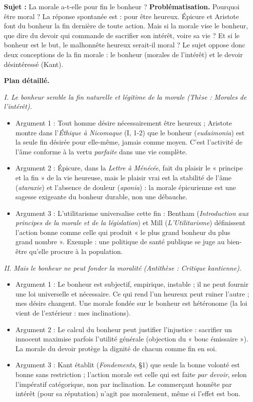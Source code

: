\documentclass[11pt]{article}
\begin{document}
\begin{exoresolu}
\textbf{Sujet :} La morale a-t-elle pour fin le bonheur ?
\tcblower
\textbf{Problématisation.} Pourquoi être moral ? La réponse spontanée est : pour être heureux. Épicure et Aristote font du bonheur la fin dernière de toute action. Mais si la morale vise le bonheur, que dire du devoir qui commande de sacrifier son intérêt, voire sa vie ? Et si le bonheur est le but, le malhonnête heureux serait-il moral ? Le sujet oppose donc deux conceptions de la fin morale : le bonheur (morales de l'intérêt) et le devoir désintéressé (Kant).

\textbf{Plan détaillé.}

\emph{I. Le bonheur semble la fin naturelle et légitime de la morale (Thèse : Morales de l'intérêt).}
\begin{itemize}
\item Argument 1 : Tout homme désire nécessairement être heureux ; Aristote montre dans l'\emph{Éthique à Nicomaque} (I, 1-2) que le bonheur (\emph{eudaimonia}) est la seule fin désirée pour elle-même, jamais comme moyen. C'est l'activité de l'âme conforme à la vertu \emph{parfaite} dans une vie complète.
\item Argument 2 : Épicure, dans la \emph{Lettre à Ménécée}, fait du plaisir le « principe et la fin » de la vie heureuse, mais le plaisir vrai est la stabilité de l'âme (\emph{ataraxie}) et l'absence de douleur (\emph{aponia}) : la morale épicurienne est une sagesse exigeante du bonheur durable, non une débauche.
\item Argument 3 : L'utilitarisme universalise cette fin : Bentham (\emph{Introduction aux principes de la morale et de la législation}) et Mill (\emph{L'Utilitarisme}) définissent l'action bonne comme celle qui produit « le plus grand bonheur du plus grand nombre ». Exemple : une politique de santé publique se juge au bien-être qu'elle procure à la population.
\end{itemize}

\emph{II. Mais le bonheur ne peut fonder la moralité (Antithèse : Critique kantienne).}
\begin{itemize}
\item Argument 1 : Le bonheur est subjectif, empirique, instable ; il ne peut fournir une loi universelle et nécessaire. Ce qui rend l'un heureux peut ruiner l'autre ; mes désirs changent. Une morale fondée sur le bonheur est hétéronome (la loi vient de l'extérieur : mes inclinations).
\item Argument 2 : Le calcul du bonheur peut justifier l'injustice : sacrifier un innocent maximise parfois l'utilité générale (objection du « bouc émissaire »). La morale du devoir protège la dignité de chacun comme fin en soi.
\item Argument 3 : Kant établit (\emph{Fondements}, §1) que seule la bonne volonté est bonne sans restriction ; l'action morale est celle qui est faite \emph{par devoir}, selon l'impératif catégorique, non par inclination. Le commerçant honnête par intérêt (pour sa réputation) n'agit pas moralement, même si l'effet est bon.
\end{itemize}


\end{exoresolu}
\end{document}
